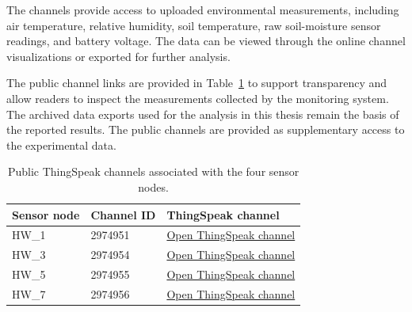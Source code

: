 The channels provide access to uploaded environmental measurements, including air temperature, relative humidity, soil temperature, raw soil-moisture sensor readings, and battery voltage. The data can be viewed through the online channel visualizations or exported for further analysis.

The public channel links are provided in Table~\ref{tab:thingspeak-channels} to support transparency and allow readers to inspect the measurements collected by the monitoring system. The archived data exports used for the analysis in this thesis remain the basis of the reported results. The public channels are provided as supplementary access to the experimental data.

\begin{table}[htbp]
\centering
\caption{Public ThingSpeak channels associated with the four sensor nodes.}
\label{tab:thingspeak-channels}
\begin{tabular}{@{}llp{}@{}}
\toprule
\textbf{Sensor node} & \textbf{Channel ID} & \textbf{ThingSpeak channel} \\
\midrule
HW\_1 & 2974951 & \href{https://thingspeak.mathworks.com/channels/2974951}{Open ThingSpeak channel} \\
HW\_3 & 2974954 & \href{https://thingspeak.mathworks.com/channels/2974954}{Open ThingSpeak channel} \\
HW\_5 & 2974955 & \href{https://thingspeak.mathworks.com/channels/2974955}{Open ThingSpeak channel} \\
HW\_7 & 2974956 & \href{https://thingspeak.mathworks.com/channels/2974956}{Open ThingSpeak channel} \\
\bottomrule
\end{tabular}
\end{table}

